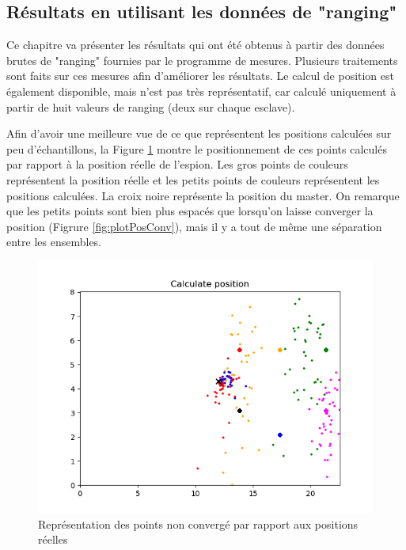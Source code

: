 \subsection{Résultats en utilisant les données de "ranging"}
Ce chapitre va présenter les résultats qui ont été obtenus à partir des données brutes de "ranging" fournies par le programme de mesures. Plusieurs traitements sont faits sur ces mesures afin d'améliorer les résultats. Le calcul de position est également disponible, mais n'est pas très représentatif, car calculé uniquement à partir de huit valeurs de ranging (deux sur chaque esclave).

Afin d'avoir une meilleure vue de ce que représentent les positions calculées sur peu d'échantillons, la Figure \ref{fig:plotPos} montre le positionnement de ces points calculés par rapport à la position réelle de l'espion. Les gros points de couleurs représentent la position réelle et les petits points de couleurs représentent les positions calculées. La croix noire représente la position du master. On remarque que les petits points sont bien plus espacés que lorsqu’on laisse converger la position (Figrure \ref{fig:plotPosConv}), mais il y a tout de même une séparation entre les ensembles.

\begin{figure}[htp]
 \begin{center}
  \includegraphics[scale=0.8]{figures/plot_pos.PNG}
  \caption{Représentation des points non convergé par rapport aux positions réelles}
  \label{fig:plotPos} %
 \end{center}
\end{figure}

